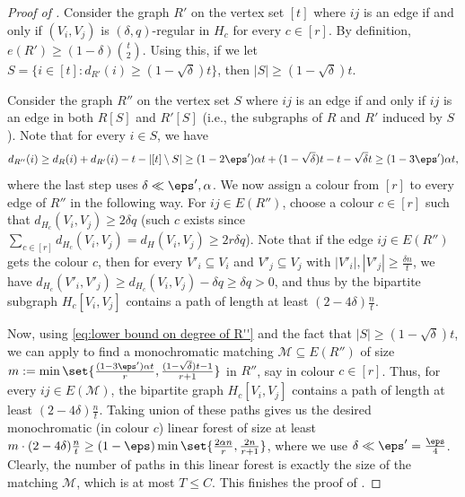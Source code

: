 \documentclass[10pt,a4paper,reqno]{amsart}
\begin{document}
\begin{proof}[Proof of ]
Consider the graph $R'$ on the vertex set $[t]$ where $ij$ is an edge if and only if $(V_i,V_j)$ is $(\delta,q)$-regular in $H_c$ for every $c\in [r]$. By definition, $e(R')\ge (1-\delta)\binom{t}{2}$. Using this, if we let $S = \{i\in [t]: d_{R'}(i)\ge (1-\sqrt{\delta})t\}$, then $|S|\ge (1-\sqrt{\delta})t$. 

Consider the graph $R''$ on the vertex set $S$ where $ij$ is an edge if and only if $ij$ is an edge in both $R[S]$ and $R'[S]$ (i.e., the subgraphs of $R$ and $R'$ induced by $S$). Note that for every $i\in S$, we have 
\begin{equation}\label{eq:lower bound on degree of R''}
d_{R''}(i)\ge d_R(i) + d_{R'}(i) - t - |[t]\setminus S| 
\ge (1 - 2\eps')\alpha t + (1 - \sqrt{\delta}) t - t - \sqrt{\delta} t
\ge (1 - 3\eps')\alpha t, 
\end{equation}
where the last step uses $\delta \ll \eps', \alpha$.
We now assign a colour from $[r]$ to every edge of $R''$ in the following way. For $ij \in E(R'')$, choose a colour $c\in [r]$ such that $d_{H_c}(V_i,V_j)\ge 2\delta q$ (such $c$ exists since $\sum_{c\in [r]} d_{H_c}(V_i,V_j) = d_H(V_i,V_j) \ge 2r\delta q$). Note that if the edge $ij \in E(R'')$ gets the colour $c$, then for every $V'_i\subseteq V_i$ and $V'_j\subseteq V_j$ with $|V'_i|,|V'_j|\ge \frac{\delta n}{t}$, we have $d_{H_c}(V'_i,V'_j) \ge d_{H_c}(V_i,V_j) - \delta q \ge \delta q > 0$, and thus by  the bipartite subgraph $H_c[V_i,V_j]$ contains a path of length at least $(2-4\delta)\frac{n}{t}$.

Now, using \eqref{eq:lower bound on degree of R''} and the fact that $|S|\ge (1-\sqrt{\delta})t$, we can apply  to find a monochromatic matching $\mathcal{M}\subseteq E(R'')$ of size $m:= \min\set{\frac{(1 - 3\eps')\alpha t}{r}, \frac{(1-\sqrt{\delta})t -1}{r+1}}$ in $R''$, say in colour $c\in [r]$. Thus, for every $ij \in E(\mathcal{M})$, the bipartite graph $H_c[V_i,V_j]$ contains a path of length at least $(2-4\delta)\frac{n}{t}$. Taking union of these paths gives us the desired monochromatic (in colour $c$) linear forest of size at least $m \cdot (2-4\delta)\frac{n}{t} \ge (1-\eps)\min\set{\frac{2\alpha n}{r}, \frac{2n}{r+1}}$, where we use $\delta\ll \eps' = \frac{\eps}{4}$. Clearly, the number of paths in this linear forest is exactly the size of the matching $\mathcal{M}$, which is at most $T\le C$. This finishes the proof of .

\end{proof}
\end{document}
